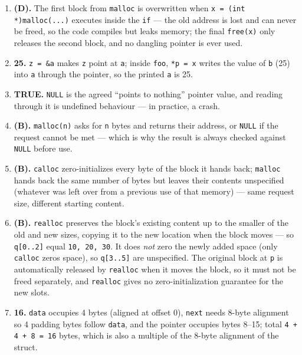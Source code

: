\documentclass[11pt]{article}
\begin{document}
\begin{enumerate}
\item[\textbf{Q7}] \textbf{(D).} The first block from \texttt{malloc} is overwritten when \texttt{x = (int *)malloc(...)} executes inside the \texttt{if} --- the old address is lost and can never be freed, so the code compiles but leaks memory; the final \texttt{free(x)} only releases the second block, and no dangling pointer is ever used.

\item[\textbf{Q8}] \textbf{25.} \texttt{z = \&a} makes \texttt{z} point at \texttt{a}; inside \texttt{foo}, \texttt{*p = x} writes the value of \texttt{b} (25) into \texttt{a} through the pointer, so the printed \texttt{a} is 25.

\item[\textbf{Q9}] \textbf{TRUE.} \texttt{NULL} is the agreed ``points to nothing'' pointer value, and reading through it is undefined behaviour --- in practice, a crash.

\item[\textbf{Q10}] \textbf{(B).} \texttt{malloc(n)} asks for \texttt{n} bytes and returns their address, or \texttt{NULL} if the request cannot be met --- which is why the result is always checked against \texttt{NULL} before use.

\item[\textbf{Q11}] \textbf{(B).} \texttt{calloc} zero-initializes every byte of the block it hands back; \texttt{malloc} hands back the same number of bytes but leaves their contents unspecified (whatever was left over from a previous use of that memory) --- same request size, different starting content.

\item[\textbf{Q12}] \textbf{(B).} \texttt{realloc} preserves the block's existing content up to the smaller of the old and new sizes, copying it to the new location when the block moves --- so \texttt{q[0..2]} equal \texttt{10, 20, 30}. It does \emph{not} zero the newly added space (only \texttt{calloc} zeros space), so \texttt{q[3..5]} are unspecified. The original block at \texttt{p} is automatically released by \texttt{realloc} when it moves the block, so it must not be freed separately, and \texttt{realloc} gives no zero-initialization guarantee for the new slots.

\item[\textbf{Q13}] \textbf{16.} \texttt{data} occupies 4 bytes (aligned at offset 0), \texttt{next} needs 8-byte alignment so 4 padding bytes follow \texttt{data}, and the pointer occupies bytes 8--15; total \texttt{4 + 4 + 8 = 16} bytes, which is also a multiple of the 8-byte alignment of the struct.


\end{enumerate}
\end{document}
